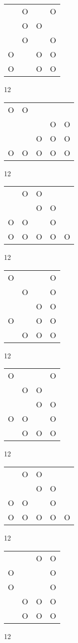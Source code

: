 \begin{tabular}{|m{0.2cm}m{0.2cm}m{0.2cm}m{0.2cm}|}\hline
 &O& &O\\
 &O&O& \\
 &O& &O\\
O& &O&O\\
O& &O&O\\
\hline\end{tabular}12
\begin{tabular}{|m{0.2cm}m{0.2cm}m{0.2cm}m{0.2cm}m{0.2cm}|}\hline
O&O& & & \\
 & & &O&O\\
 & &O&O&O\\
O&O&O&O&O\\
\hline\end{tabular}12
\begin{tabular}{|m{0.2cm}m{0.2cm}m{0.2cm}m{0.2cm}m{0.2cm}|}\hline
 &O&O& & \\
 & &O&O& \\
O&O& &O& \\
O&O&O&O&O\\
\hline\end{tabular}12
\begin{tabular}{|m{0.2cm}m{0.2cm}m{0.2cm}m{0.2cm}|}\hline
O& & &O\\
 &O& &O\\
 & &O&O\\
O& &O&O\\
 &O&O&O\\
\hline\end{tabular}12
\begin{tabular}{|m{0.2cm}m{0.2cm}m{0.2cm}m{0.2cm}|}\hline
O& & &O\\
 &O&O& \\
 & &O&O\\
O&O& &O\\
 &O&O&O\\
\hline\end{tabular}12
\begin{tabular}{|m{0.2cm}m{0.2cm}m{0.2cm}m{0.2cm}m{0.2cm}|}\hline
 &O&O& & \\
 & &O&O& \\
O&O& &O& \\
O&O&O&O&O\\
\hline\end{tabular}12
\begin{tabular}{|m{0.2cm}m{0.2cm}m{0.2cm}m{0.2cm}|}\hline
 & &O&O\\
O& & &O\\
O& & &O\\
 &O&O&O\\
 &O&O&O\\
\hline\end{tabular}12
